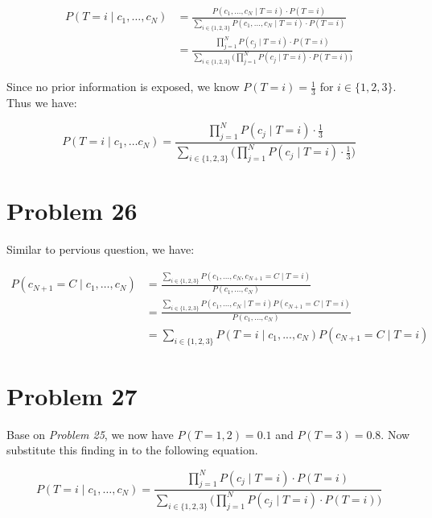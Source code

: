 \documentclass[12pt]{article}
\begin{document}
\begin{align*}
    P(T = i \mid c_1, \dots, c_N) &= \frac{P(c_1, \dots, c_N \mid T = i)\cdot P(T = i)}{\sum\limits_{i \in \{1, 2, 3\}} P(c_1, \dots, c_N \mid T = i) \cdot P(T = i)} \\
    &= \frac{\prod\limits_{j = 1}^{N} P(c_j \mid T = i) \cdot P(T = i) }{\sum\limits_{i \in \{1, 2, 3\}} \big ( \prod\limits_{j = 1}^{N} P(c_j \mid T = i) \cdot P(T = i)\big ) }
\end{align*}

Since no prior information is exposed, we know $P(T = i) = \frac{1}{3}$ for $i \in \{1, 2, 3\}$. Thus we have:

\begin{equation*}
    P(T = i \mid c_1, \dots c_N) = \frac{\prod\limits_{j = 1}^{N} P(c_j \mid T = i) \cdot \frac{1}{3} }{\sum\limits_{i \in \{1, 2, 3\}} \big ( \prod\limits_{j = 1}^{N} P(c_j \mid T = i) \cdot \frac{1}{3} \big ) }
\end{equation*}


\section{Problem 26}


Similar to pervious question, we have:

\begin{align*}
    P(c_{N+1} = C \mid c_1, \dots, c_N) &= \frac{\sum\limits_{i \in \{1, 2, 3\}} P(c_1, ..., c_N, c_{N+1} = C \mid T = i) }{P(c_1, \dots, c_N)} \\
    &= \frac{\sum\limits_{i \in \{1, 2, 3\}} P(c_1, ..., c_N \mid T = i) P( c_{N+1} = C \mid T = i) }{P(c_1, \dots, c_N)} \\
    &= \sum\limits_{i \in \{1, 2, 3\}} P( T = i\mid c_1, ..., c_N) P( c_{N+1} = C \mid T = i)
\end{align*}


\section{Problem 27}


Base on \textit{Problem 25}, we now have $P(T = 1, 2) = 0.1$ and  $P(T = 3) = 0.8$. Now substitute this finding in to the following equation.

\begin{equation*}
    P(T = i \mid c_1, \dots, c_N) = \frac{\prod\limits_{j = 1}^{N} P(c_j \mid T = i) \cdot P(T = i) }{\sum\limits_{i \in \{1, 2, 3\}} \big ( \prod\limits_{j = 1}^{N} P(c_j \mid T = i) \cdot P(T = i)\big ) }
\end{equation*}
\end{document}
